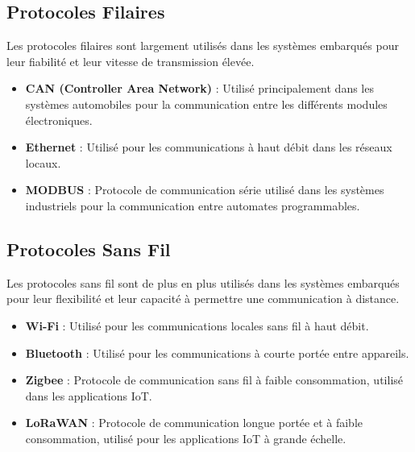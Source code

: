 \documentclass[10pt,a4paper]{article}
\begin{document}

\subsection*{Protocoles Filaires}

Les protocoles filaires sont largement utilisés dans les systèmes embarqués pour leur fiabilité et leur vitesse de transmission élevée.

\begin{itemize}
    \item \textbf{CAN (Controller Area Network)} : Utilisé principalement dans les systèmes automobiles pour la communication entre les différents modules électroniques.
    \item \textbf{Ethernet} : Utilisé pour les communications à haut débit dans les réseaux locaux.
    \item \textbf{MODBUS} : Protocole de communication série utilisé dans les systèmes industriels pour la communication entre automates programmables.
\end{itemize}


\subsection*{Protocoles Sans Fil}

Les protocoles sans fil sont de plus en plus utilisés dans les systèmes embarqués pour leur flexibilité et leur capacité à permettre une communication à distance.

\begin{itemize}
    \item \textbf{Wi-Fi} : Utilisé pour les communications locales sans fil à haut débit.
    \item \textbf{Bluetooth} : Utilisé pour les communications à courte portée entre appareils.
    \item \textbf{Zigbee} : Protocole de communication sans fil à faible consommation, utilisé dans les applications IoT.
    \item \textbf{LoRaWAN} : Protocole de communication longue portée et à faible consommation, utilisé pour les applications IoT à grande échelle.
\end{itemize}
\end{document}
